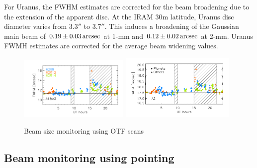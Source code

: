 For Uranus, the FWHM estimates are corrected for the beam broadening due
to the extension of the apparent disc. At the IRAM 30m latitude,
Uranus disc diameter varies from $3.3''$ to $3.7''$. This induces a
broadening of the Gaussian main beam of $0.19 \pm 0.03\,\rm{arcsec}$ at
1-mm and $0.12 \pm 0.02\,\rm{arcsec}$ at 2-mm. Uranus FWMH estimates are
corrected for the average beam widening values. 

\begin{figure}[ht!]
  \begin{center}
    \includegraphics[clip=true, trim={0.9cm, 0.5cm, 0.5cm, 0.5cm}, width=0.4725\textwidth]{Figures/Beams/Beam_monitoring_with_otfs_vs_ut_1mm.pdf}
    \includegraphics[clip=true, trim={0.5cm, 0.5cm, 0.5cm, 0.5cm}, width=0.4875\textwidth]{Figures/Beams/Beam_monitoring_with_otfs_vs_ut_a2.pdf}
    \caption[Beam size monitoring using OTF scans]{Beam size monitoring using OTF scans} 
\label{fig:beam_monitoring_otf}
\end{center}
\end{figure}

\subsection{Beam monitoring using pointing}


